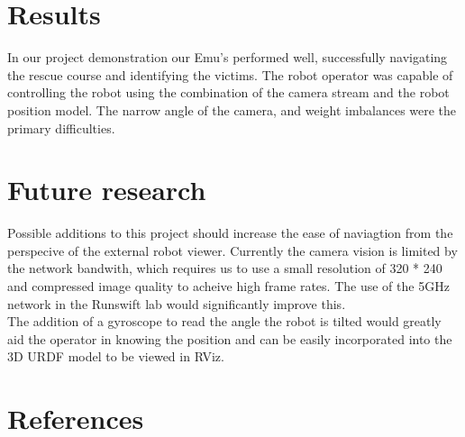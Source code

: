 \documentclass[titlepage,12pt,a4paper]{article}
\begin{document}
\section*{Results}
In our project demonstration our Emu's performed well, successfully navigating the rescue course and identifying the victims. The robot operator was capable of controlling the robot using the combination of the camera stream and the robot position model. The narrow angle of the camera, and weight imbalances were the primary difficulties.

\section*{Future research}
Possible additions to this project should increase the ease of naviagtion from the perspecive of the external robot viewer. Currently the camera vision is limited by the network bandwith, which requires us to use a small resolution of 320 * 240 and compressed image quality to acheive high frame rates. The use of the 5GHz network in the Runswift lab would significantly improve this.\\

\noindent The addition of a gyroscope to read the angle the robot is tilted would greatly aid the operator in knowing the position and can be easily incorporated into the 3D URDF model to be viewed in RViz.


\section*{References}
\end{document}
